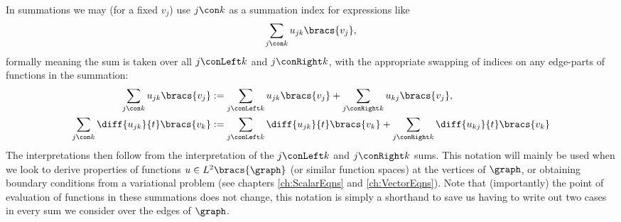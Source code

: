 In summations we may (for a fixed $v_j$) use $j\con k$ as a summation index for expressions like
\begin{align*}
	\sum_{j\con k} u_{jk}\bracs{v_j},
\end{align*} 
formally meaning the sum is taken over all $j\conLeft k$ and $j\conRight k$, with the appropriate swapping of indices on any edge-parts of functions in the summation:
\begin{align*}
	\sum_{j\con k} u_{jk}\bracs{v_j} &:= \sum_{j\conLeft k}u_{jk}\bracs{v_j} + \sum_{j\conRight k}u_{kj}\bracs{v_j}, \\
	\sum_{j\con k} \diff{u_{jk}}{t}\bracs{v_k} &:= \sum_{j\conLeft k} \diff{u_{jk}}{t}\bracs{v_k} + \sum_{j\conRight k} \diff{u_{kj}}{t}\bracs{v_k}
\end{align*}
The interpretations then follow from the interpretation of the $j\conLeft k$ and $j\conRight k$ sums.
This notation will mainly be used when we look to derive properties of functions $u\in L^2\bracs{\graph}$ (or similar function spaces) at the vertices of $\graph$, or obtaining boundary conditions from a variational problem (see chapters \ref{ch:ScalarEqns} and \ref{ch:VectorEqns}).
Note that (importantly) the point of evaluation of functions in these summations does not change, this notation is simply a shorthand to save us having to write out two cases in every sum we consider over the edges of $\graph$. \newline

